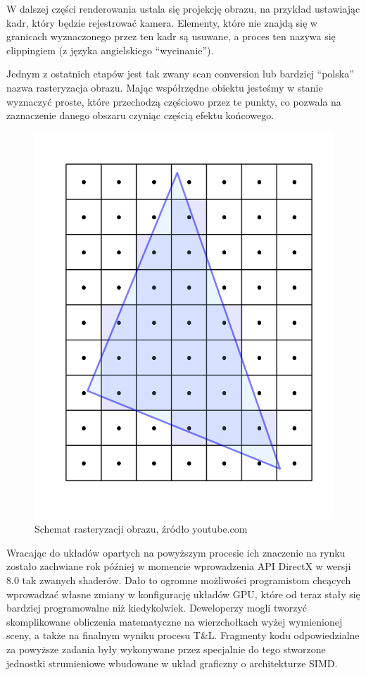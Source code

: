\documentclass{article}
\begin{document}
	\par
	W dalszej części renderowania ustala się projekcję obrazu, na przykład ustawiając kadr, który będzie rejestrować kamera. Elementy, które nie znajdą się w granicach wyznaczonego przez ten kadr są usuwane, a proces ten nazywa się clippingiem (z języka angielskiego “wycinanie”).
	\par
	Jednym z ostatnich etapów jest tak zwany scan conversion lub bardziej “polska” nazwa rasteryzacja obrazu. Mając współrzędne obiektu jesteśmy w stanie wyznaczyć proste, które przechodzą częściowo przez te punkty, co pozwala na zaznaczenie danego obszaru czyniąc częścią efektu końcowego.
	\begin{figure}
		\centering
		\includegraphics[width=15cm]{polygon}
		\caption{Schemat rasteryzacji obrazu, źródło youtube.com}
	\end{figure}
	\par
	Wracając do układów opartych na powyższym procesie ich znaczenie na rynku zostało zachwiane rok później w momencie wprowadzenia API DirectX w wersji 8.0 tak zwanych shaderów. Dało to ogromne możliwości programistom chcących wprowadzać własne zmiany w konfigurację układów GPU, które od teraz stały się bardziej programowalne niż kiedykolwiek. Deweloperzy mogli tworzyć skomplikowane obliczenia matematyczne na wierzchołkach wyżej wymienionej sceny, a także na finalnym wyniku procesu T\&L. Fragmenty kodu odpowiedzialne za powyższe zadania były wykonywane przez specjalnie do tego stworzone jednostki strumieniowe wbudowane w układ graficzny o architekturze SIMD.
\end{document}
